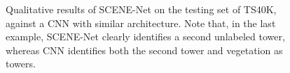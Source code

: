 \documentclass[final,supplement,onefignum,onetabnum]{siamonline171218}
\begin{document}
\begin{figure}[t]
    


    \caption{Qualitative results of SCENE-Net on the testing set of TS40K, against a CNN with similar architecture. Note that, in the last example, SCENE-Net clearly identifies a second unlabeled tower, whereas CNN identifies both the second tower and vegetation as towers.}
\label{fig:results}
\end{figure}
\end{document}
